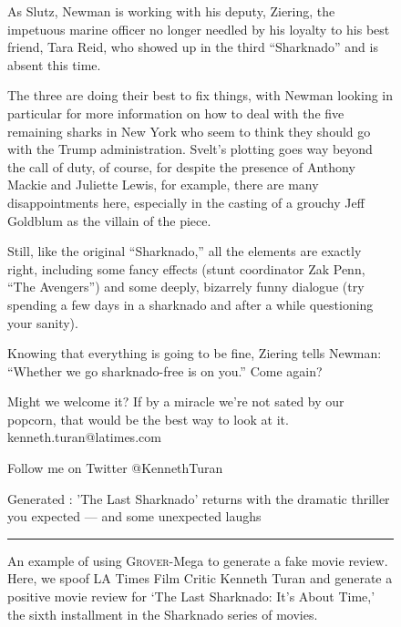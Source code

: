 \documentclass{article}
\newcommand{\modelname}{{\textsc{Grover}}}
\begin{document}
\begin{figure}[t]
{As Slutz, Newman is working with his deputy, Ziering, the impetuous marine officer no longer needled by his loyalty to his best friend, Tara Reid, who showed up in the third “Sharknado” and is absent this time.

The three are doing their best to fix things, with Newman looking in particular for more information on how to deal with the five remaining sharks in New York who seem to think they should go with the Trump administration.
Svelt’s plotting goes way beyond the call of duty, of course, for despite the presence of Anthony Mackie and Juliette Lewis, for example, there are many disappointments here, especially in the casting of a grouchy Jeff Goldblum as the villain of the piece.

Still, like the original “Sharknado,” all the elements are exactly right, including some fancy effects (stunt coordinator Zak Penn, “The Avengers”) and some deeply, bizarrely funny dialogue (try spending a few days in a sharknado and after a while questioning your sanity).

Knowing that everything is going to be fine, Ziering tells Newman: “Whether we go sharknado-free is on you.” Come again?

Might we welcome it? If by a miracle we’re not sated by our popcorn, that would be the best way to look at it.
kenneth.turan@latimes.com

Follow me on Twitter @KennethTuran

}

Generated \headlinefield: 'The Last Sharknado' returns with the dramatic thriller you expected — and some unexpected laughs

\hrule
\caption{An example of using \modelname-Mega to generate a fake movie review. Here, we spoof LA Times Film Critic Kenneth Turan and generate a positive movie review for `The Last Sharknado: It's About Time,' the sixth installment in the Sharknado series of movies.}
\label{fig:sharknado}
\end{figure}
 
\end{document}
